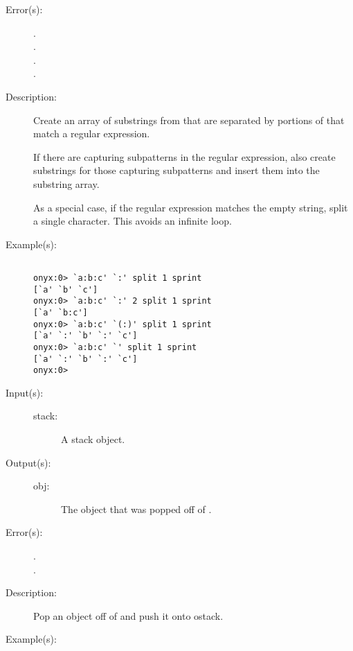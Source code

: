 \begin{description}
\begin{description}
	\item[Error(s): ]
		\begin{description}\item[]
		\item[.]
		\item[.]
		\item[.]
		\item[.]
		\end{description}
	\item[Description: ]
		Create an array of substrings from  that are
		separated by portions of  that match a regular
		expression.

		If there are capturing subpatterns in the regular expression,
		also create substrings for those capturing subpatterns and
		insert them into the substring array.

		As a special case, if the regular expression matches the empty
		string, split a single character.  This avoids an infinite
		loop.
	\item[Example(s): ]\begin{verbatim}

onyx:0> `a:b:c' `:' split 1 sprint
[`a' `b' `c']
onyx:0> `a:b:c' `:' 2 split 1 sprint
[`a' `b:c']
onyx:0> `a:b:c' `(:)' split 1 sprint
[`a' `:' `b' `:' `c']
onyx:0> `a:b:c' `' split 1 sprint
[`a' `:' `b' `:' `c']
onyx:0>
		\end{verbatim}
	\end{description}
\label{systemdict:spop}
\item[{\onyxop{stack}{spop}{obj}}: ]
	\begin{description}\item[]
	\item[Input(s): ]
		\begin{description}\item[]
		\item[stack: ]
			A stack object.
		\end{description}
	\item[Output(s): ]
		\begin{description}\item[]
		\item[obj: ]
			The object that was popped off of .
		\end{description}
	\item[Error(s): ]
		\begin{description}\item[]
		\item[.]
		\item[.]
		\end{description}
	\item[Description: ]
		Pop an object off of  and push it onto ostack.
	\item[Example(s): ]\begin{verbatim}


\end{verbatim}
\end{description}
\end{description}
